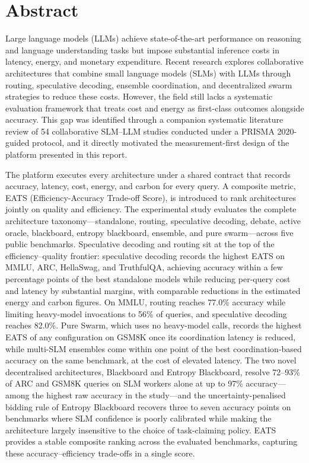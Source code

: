 \chapter*{Abstract}

Large language models (LLMs) achieve state-of-the-art performance on reasoning and language understanding tasks but impose substantial inference costs in latency, energy, and monetary expenditure. Recent research explores collaborative architectures that combine small language models (SLMs) with LLMs through routing, speculative decoding, ensemble coordination, and decentralized swarm strategies to reduce these costs. However, the field still lacks a systematic evaluation framework that treats cost and energy as first-class outcomes alongside accuracy. This gap was identified through a companion systematic literature review of 54 collaborative SLM--LLM studies conducted under a PRISMA 2020-guided protocol, and it directly motivated the measurement-first design of the platform presented in this report.

The platform executes every architecture under a shared contract that records accuracy, latency, cost, energy, and carbon for every query. A composite metric, EATS (Efficiency-Accuracy Trade-off Score), is introduced to rank architectures jointly on quality and efficiency. The experimental study evaluates the complete architecture taxonomy---standalone, routing, speculative decoding, debate, active oracle, blackboard, entropy blackboard, ensemble, and pure swarm---across five public benchmarks. Speculative decoding and routing sit at the top of the efficiency--quality frontier: speculative decoding records the highest EATS on MMLU, ARC, HellaSwag, and TruthfulQA, achieving accuracy within a few percentage points of the best standalone models while reducing per-query cost and latency by substantial margins, with comparable reductions in the estimated energy and carbon figures. On MMLU, routing reaches 77.0\% accuracy while limiting heavy-model invocations to 56\% of queries, and speculative decoding reaches 82.0\%. Pure Swarm, which uses no heavy-model calls, records the highest EATS of any configuration on GSM8K once its coordination latency is reduced, while multi-SLM ensembles come within one point of the best coordination-based accuracy on the same benchmark, at the cost of elevated latency. The two novel decentralised architectures, Blackboard and Entropy Blackboard, resolve 72--93\% of ARC and GSM8K queries on SLM workers alone at up to 97\% accuracy---among the highest raw accuracy in the study---and the uncertainty-penalised bidding rule of Entropy Blackboard recovers three to seven accuracy points on benchmarks where SLM confidence is poorly calibrated while making the architecture largely insensitive to the choice of task-claiming policy. EATS provides a stable composite ranking across the evaluated benchmarks, capturing these accuracy--efficiency trade-offs in a single score.

